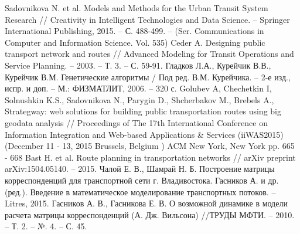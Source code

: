 \begin{thebibliography}{10}
     Sadovnikova N. et al. Models and Methods for the Urban Transit System Research //
        Creativity in Intelligent Technologies and Data Science. -- Springer International Publishing, 
        2015. -- С. 488-499. -- (Ser. Communications in Computer and Information Science. Vol. 535)
     Ceder A. Designing public transport network and routes //
        Advanced Modeling for Transit Operations and Service Planning. -- 2003. -- Т. 3. -- С. 59-91.
     Гладков Л.А., Курейчик В.В., Курейчик В.М. Генетические алгоритмы / 
        Под ред. В.М. Курейчика. -- 2-е изд., испр. и доп. -- М.: ФИЗМАТЛИТ, 2006. -- 320 с.
     Golubev A, Chechetkin I, Solnushkin K.S., Sadovnikova N., Parygin D., Shcherbakov M., 
        Brebels A., Strategway: web solutions for building public transportation routes using big geodata 
        analysis // Proceedings of The 17th International Conference on Information Integration and 
        Web-based Applications \& Services (iiWAS2015) (December 11 - 13, 2015 Brussels, Belgium ) 
        ACM New York, New York pp. 665 - 668
     Bast H. et al. Route planning in transportation networks //
        arXiv preprint arXiv:1504.05140. -- 2015.
     Чалой Е. В., Шамрай Н. Б. Построение матрицы корреспонденций для транспортной 
        сети г. Владивостока. %
     Гасников А. и др. (ред.). Введение в математическое моделирование транспортных 
        потоков. -- Litres, 2015.
     Гасников А. В., Гасникова Е. В. О возможной динамике в модели расчета матрицы корреспонденций (А. Дж. Вильсона) //ТРУДЫ МФТИ. -- 2010. -- Т. 2. -- №. 4. -- С. 45.
\end{thebibliography}
